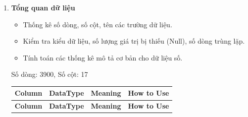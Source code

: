     \begin{enumerate}[label=\arabic*]
        \item \textbf{Tổng quan dữ liệu}
        \begin{itemize}
            \item Thống kê số dòng, số cột, tên các trường dữ liệu.
            \item Kiểm tra kiểu dữ liệu, số lượng giá trị bị thiếu (Null), số dòng trùng lặp.
            \item Tính toán các thống kê mô tả cơ bản cho dữ liệu số.
    \end{itemize}
     Số dòng: 3900, Số cột: 17
    \begin{longtable}{|>{\raggedright\arraybackslash}p{2.8cm}|
                          >{\raggedright\arraybackslash}p{2cm}|
                          >{\raggedright\arraybackslash}p{6cm}|
                          >{\raggedright\arraybackslash}p{5cm}|}
        \hline
        \textbf{Column} & \textbf{DataType} & \textbf{Meaning} & \textbf{How to Use} \\ \hline
        \endfirsthead
        
        \hline
        \textbf{Column} & \textbf{DataType} & \textbf{Meaning} & \textbf{How to Use} \\ \hline
        \endhead
        

\end{longtable}
\end{enumerate}
